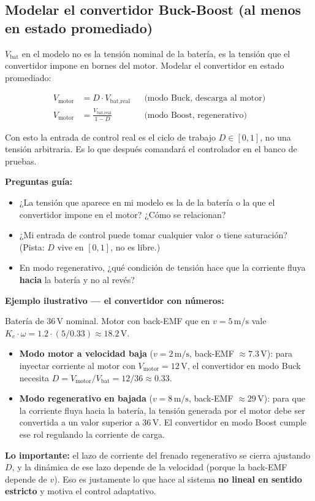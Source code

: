 \documentclass[11pt,a4paper]{article}
\newcommand{\unit}[1]{\,\mathrm{#1}}
\begin{document}
\subsection{Modelar el convertidor Buck-Boost (al menos en estado promediado)}

$V_{\text{bat}}$ en el modelo no es la tensión nominal de la batería, es la tensión que el convertidor impone en bornes del motor. Modelar el convertidor en estado promediado:

\begin{align}
V_{\text{motor}} &= D \cdot V_{\text{bat,real}} && \text{(modo Buck, descarga al motor)} \\
V_{\text{motor}} &= \frac{V_{\text{bat,real}}}{1-D} && \text{(modo Boost, regenerativo)}
\end{align}

Con esto la entrada de control real es el ciclo de trabajo $D \in [0,1]$, no una tensión arbitraria. Es lo que después comandará el controlador en el banco de pruebas.

\begin{guia}
\textbf{Preguntas guía:}
\begin{itemize}
    \item ¿La tensión que aparece en mi modelo es la de la batería o la que el convertidor impone en el motor? ¿Cómo se relacionan?
    \item ¿Mi entrada de control puede tomar cualquier valor o tiene saturación? (Pista: $D$ vive en $[0,1]$, no es libre.)
    \item En modo regenerativo, ¿qué condición de tensión hace que la corriente fluya \textbf{hacia} la batería y no al revés?
\end{itemize}
\end{guia}

\begin{ejemplo}
\textbf{Ejemplo ilustrativo --- el convertidor con números:}

Batería de $36\unit{V}$ nominal. Motor con back-EMF que en $v=5\unit{m/s}$ vale $K_e \cdot \omega = 1.2 \cdot (5/0.33) \approx 18.2\unit{V}$.

\begin{itemize}
    \item \textbf{Modo motor a velocidad baja} ($v=2\unit{m/s}$, back-EMF $\approx 7.3\unit{V}$): para inyectar corriente al motor con $V_{\text{motor}}=12\unit{V}$, el convertidor en modo Buck necesita $D = V_{\text{motor}}/V_{\text{bat}} = 12/36 \approx 0.33$.
    \item \textbf{Modo regenerativo en bajada} ($v=8\unit{m/s}$, back-EMF $\approx 29\unit{V}$): para que la corriente fluya hacia la batería, la tensión generada por el motor debe ser convertida a un valor superior a $36\unit{V}$. El convertidor en modo Boost cumple ese rol regulando la corriente de carga.
\end{itemize}

\textbf{Lo importante:} el lazo de corriente del frenado regenerativo se cierra ajustando $D$, y la dinámica de ese lazo depende de la velocidad (porque la back-EMF depende de $v$). Eso es justamente lo que hace al sistema \textbf{no lineal en sentido estricto} y motiva el control adaptativo.
\end{ejemplo}
\end{document}

